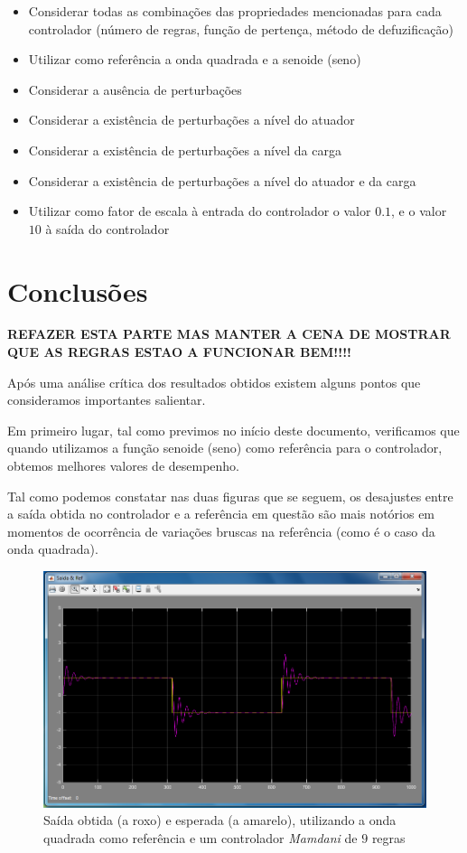 \documentclass{article}
\begin{document}
\begin{itemize}
\item Considerar todas as combinações das propriedades mencionadas para cada controlador (número de regras, função de pertença, método de defuzificação)
\item Utilizar como referência a onda quadrada e a senoide (seno)
\item Considerar a ausência de perturbações
\item Considerar a existência de perturbações a nível do atuador
\item Considerar a existência de perturbações a nível da carga
\item Considerar a existência de perturbações a nível do atuador e da carga
\item Utilizar como fator de escala à entrada do controlador o valor $0.1$, e o valor $10$ à saída do controlador
\end{itemize}

\pagebreak

\section{Conclusões}

\textbf{REFAZER ESTA PARTE MAS MANTER A CENA DE MOSTRAR QUE AS REGRAS ESTAO A FUNCIONAR BEM!!!!}

Após uma análise crítica dos resultados obtidos existem alguns pontos que consideramos importantes salientar.

Em primeiro lugar, tal como previmos no início deste documento, verificamos que quando utilizamos a função senoide (seno) como referência para o controlador, obtemos melhores valores de desempenho.

Tal como podemos constatar nas duas figuras que se seguem, os desajustes entre a saída obtida no controlador e a referência em questão são mais notórios em momentos de ocorrência de variações bruscas na referência (como é o caso da onda quadrada).

\begin{figure}[h]
  \centering
      \includegraphics[scale=0.3]{Images/Mamdani_9_square.png}
  \caption{Saída obtida (a roxo) e esperada (a amarelo), utilizando a onda quadrada como referência e um controlador \emph{Mamdani} de $9$ regras}
\end{figure}
\end{document}

